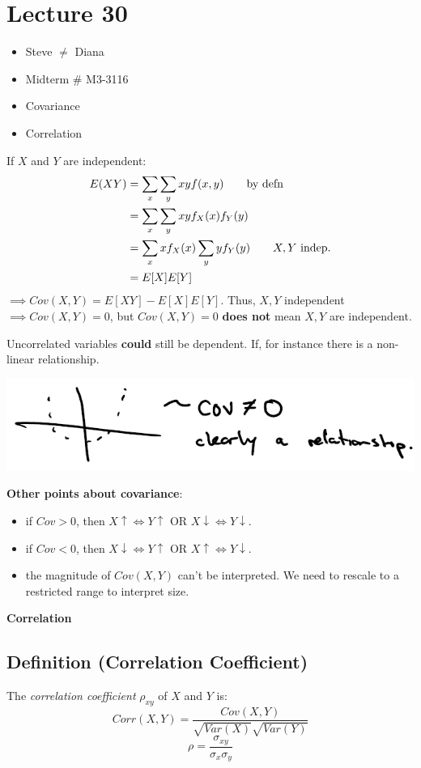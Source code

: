 \section{Lecture 30}
\begin{itemize}
    \item Steve $ \neq $ Diana
    \item Midterm \# M3-3116
    \item Covariance
    \item Correlation
\end{itemize}
If $ X $ and $ Y $ are independent:
\begin{align*}
    E(XY)&=
    \sum\limits_{x} \sum\limits_{y} x y f(x,y)\qquad\text{by defn}\\
    &= \sum\limits_{x} \sum\limits_{y} x y f
_X(x)f_Y(y)\\
    &=\sum\limits_{x} x f
_X(x) \sum\limits_{y} y f
_Y(y)\qquad\text{$ X,Y $ indep.}\\
    &=E[X]E[Y]
\end{align*}
$ \implies Cov(X,Y)=E[XY]-E[X]E[Y] $. Thus, $ X,Y $ independent
$ \implies Cov(X,Y)=0 $, but $ Cov(X,Y) = 0 $ \textbf{does not}
mean $ X,Y $ are independent.

Uncorrelated variables \textbf{could} still be dependent. If, for
instance there is a non-linear relationship.

\begin{center}
    \includegraphics{covnot0.png}
\end{center}

\textbf{Other points about covariance}:
\begin{itemize}
    \item if $ Cov>0 $, then $ X\uparrow \iff Y\uparrow $ OR
    $ X\downarrow \iff Y\downarrow $.
    \item if $ Cov<0 $, then $ X\downarrow \iff Y\uparrow $ OR
    $ X\uparrow \iff Y\downarrow $.
    \item the magnitude of $ Cov(X,Y) $ can't be interpreted. We need
    to rescale to a restricted range to interpret size.
\end{itemize}

\textbf{Correlation}
\begin{defbox}
    \subsection{Definition (Correlation Coefficient)}
    The \emph{correlation coefficient} $ \rho_{x y} $ of $ X $ and $ Y $ is:
    \[ Corr(X,Y)=\frac{Cov(X,Y)}{\sqrt{Var(X)}\sqrt{Var(Y)}} \]
    \[ \rho=\frac{\sigma_{x y}}{\sigma_x\sigma_y}  \]    
\end{defbox}

